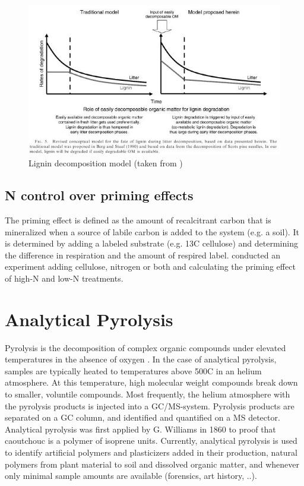 \begin{figure} 
\begin{center} 
\includegraphics{decompositionmodel_klotzbuecher.jpg}
\caption{Lignin decomposition model (taken from \cite{Klotzbucher2011})} 
\label{fig:klotzbuecher}
\end{center} 
\end{figure}  

\subsection{N control over priming effects}

The priming effect is defined as the amount of recalcitrant carbon that is mineralized when a source of labile carbon is added to the system (e.g. a soil). It is determined by adding a labeled substrate (e.g. 13C cellulose) and determining the difference in respiration and the amount of respired label. \cite{Fontaine2011} conducted an experiment adding cellulose, nitrogen or both and calculating the priming effect of high-N and low-N treatments. 

\section{Analytical Pyrolysis}

Pyrolysis is the decomposition of complex organic compounds under elevated temperatures in the absence of oxygen \citep{Moldoveanu}. In the case of analytical pyrolysis, samples are typically heated to temperatures above 500\textdegree C in an helium atmosphere. At this temperature, high molecular weight compounds break down to smaller, voluntile compounds. Most frequently, the helium atmosphere with the pyrolysis products is injected into a GC/MS-system. Pyrolysis products are separated on a GC column, and identified and quantified on a MS detector. Analytical pyrolysis was first applied by G. Williams in 1860 to proof that caoutchouc is a polymer of isoprene units. Currently, analytical pyrolysis is used to identify artificial polymers and plasticizers added in their production, natural polymers from plant material to soil and dissolved organic matter, and whenever only minimal sample amounts are available (forensics, art history, ..). 

